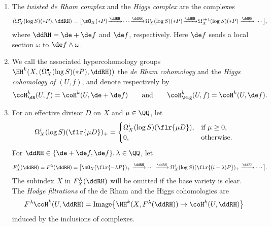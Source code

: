 \begin{definition*}\quad\begin{enumerate}\itemsep=0pt
\item[(i)] The \textit{twisted de Rham complex} and the \textit{Higgs complex} are the complexes
\begin{gather*}
(\Omega_X^\bullet(\log S)(*P), \ddRH) = \big[ \sO_X(*P) \!\xrightarrow{\ddRH} \!\cdots\! \xrightarrow{\ddRH} \! \Omega_X^i(\log S)(*P) \!\xrightarrow{\ddRH}\! \Omega_X^{i+1}(\log S)(*P)\xrightarrow{\ddRH}\!\cdots \big],
\end{gather*}
where $\ddRH = \de + \de f$ and $\de f$, respectively. Here $\de f$ sends a local section $\omega$ to $\de f\wedge \omega$.

\item[(ii)] We call the associated hypercohomology groups $\HH^k(X,(\Omega_X^\bullet(\log S)(*P), \ddRH))$ the \textit{de Rham cohomology} and the \textit{Higgs cohomology of $(U,f)$}, and denote respectively by
\begin{gather*} \coH_\dR^k(U,f) = \coH^k(U,\de +\de f) \qquad\text{and}\qquad \coH_\Hig^k(U,f) = \coH^k(U,\de f). \end{gather*}

\item[(iii)] For an effective divisor $D$ on $X$ and $\mu\in\QQ$, let
\begin{gather*} \Omega_X^i(\log S)(\flr{\mu D})_+ = \begin{cases}
\Omega_X^i(\log S)(\flr{\mu D}), & \text{if $\mu\geq 0$}, \\
0, & \text{otherwise}.
\end{cases} \end{gather*}
For $\ddRH \in \{\de +\de f, \de f\}, \lambda \in \QQ$, let
\begin{gather*} F_X^\lambda(\ddRH) = F^\lambda(\ddRH) =
\big[ \sO_X(\flr{-\lambda P})_+ \xrightarrow{\ddRH} \cdots \xrightarrow{\ddRH} \Omega_X^i(\log S)(\flr{(i-\lambda)P})_+ \xrightarrow{\ddRH} \cdots \big]. \end{gather*}
The subindex $X$ in $F_X^\lambda(\ddRH)$ will be omitted if the base variety is clear. The \textit{Hodge filtrations} of the de Rham and the Higgs cohomologies are \begin{gather}\label{eq:H-fil}
F^\lambda\coH^k(U,\ddRH) = \mathrm{Image}\big\{ \HH^k(X,F^\lambda(\ddRH)) \to \coH^k(U,\ddRH) \big\}
\end{gather}
induced by the inclusions of complexes.


\end{enumerate}
\end{definition*}
